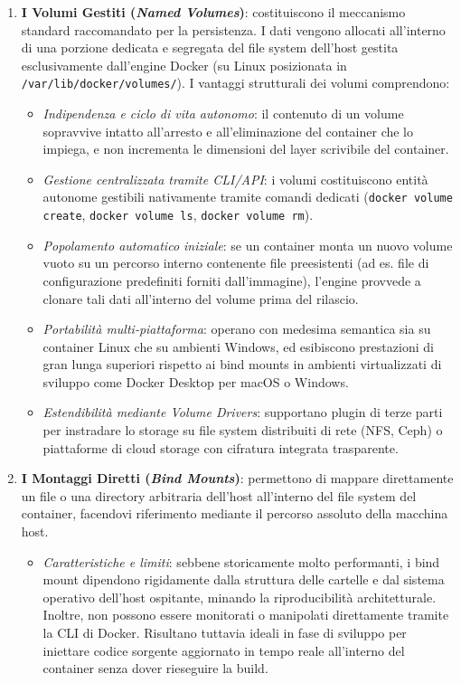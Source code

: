 \documentclass[11pt, a4paper]{article}
\begin{document}
\begin{enumerate}
    \item \textbf{I Volumi Gestiti (\emph{Named Volumes})}: costituiscono il meccanismo standard raccomandato per la persistenza. I dati vengono allocati all'interno di una porzione dedicata e segregata del file system dell'host gestita esclusivamente dall'engine Docker (su Linux posizionata in \texttt{/var/lib/docker/volumes/}).
    I vantaggi strutturali dei volumi comprendono:
    \begin{itemize}
        \item \emph{Indipendenza e ciclo di vita autonomo}: il contenuto di un volume sopravvive intatto all'arresto e all'eliminazione del container che lo impiega, e non incrementa le dimensioni del layer scrivibile del container.
        \item \emph{Gestione centralizzata tramite CLI/API}: i volumi costituiscono entità autonome gestibili nativamente tramite comandi dedicati (\texttt{docker volume create}, \texttt{docker volume ls}, \texttt{docker volume rm}).
        \item \emph{Popolamento automatico iniziale}: se un container monta un nuovo volume vuoto su un percorso interno contenente file preesistenti (ad es. file di configurazione predefiniti forniti dall'immagine), l'engine provvede a clonare tali dati all'interno del volume prima del rilascio.
        \item \emph{Portabilità multi-piattaforma}: operano con medesima semantica sia su container Linux che su ambienti Windows, ed esibiscono prestazioni di gran lunga superiori rispetto ai bind mounts in ambienti virtualizzati di sviluppo come Docker Desktop per macOS o Windows.
        \item \emph{Estendibilità mediante Volume Drivers}: supportano plugin di terze parti per instradare lo storage su file system distribuiti di rete (NFS, Ceph) o piattaforme di cloud storage con cifratura integrata trasparente.
    \end{itemize}
    \item \textbf{I Montaggi Diretti (\emph{Bind Mounts})}: permettono di mappare direttamente un file o una directory arbitraria dell'host all'interno del file system del container, facendovi riferimento mediante il percorso assoluto della macchina host.
    \begin{itemize}
        \item \emph{Caratteristiche e limiti}: sebbene storicamente molto performanti, i bind mount dipendono rigidamente dalla struttura delle cartelle e dal sistema operativo dell'host ospitante, minando la riproducibilità architetturale. Inoltre, non possono essere monitorati o manipolati direttamente tramite la CLI di Docker. Risultano tuttavia ideali in fase di sviluppo per iniettare codice sorgente aggiornato in tempo reale all'interno del container senza dover rieseguire la build.

\end{itemize}
\end{enumerate}
\end{document}
